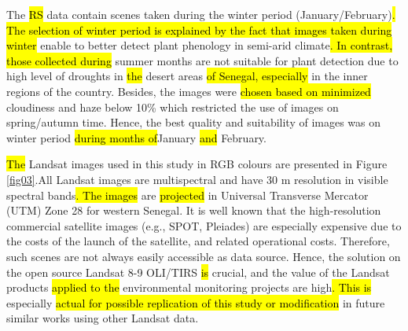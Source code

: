 \documentclass[earth,article,submit,pdftex,moreauthors]{Definitions/mdpi}
\begin{document}
The \hl{RS} data contain scenes taken during the winter period (January/February)\hl{. The selection of winter period is explained by the fact that images taken during winter }enable to better detect plant phenology in semi-arid climate\hl{. In contrast, those collected during }summer months are not suitable for plant detection due to high level of droughts in \hl{the }desert areas \hl{of Senegal, especially }in the inner regions of the country. Besides, the images were \hl{chosen based on minimized} cloudiness and haze below 10\% which restricted the use of images on spring/autumn time. Hence, the best quality and suitability of images was on winter period \hl{during months of}January \hl{and} February.

\hl{The} Landsat images used in this study in RGB colours are presented in Figure \ref{fig03}.All Landsat images are multispectral and have 30 m resolution in visible spectral bands\hl{. The images }are \hl{projected} in Universal Transverse Mercator (UTM) Zone 28 for western Senegal. It is well known that the high-resolution commercial satellite images (e.g., SPOT, Pleiades) are especially expensive due to the costs of the launch of the satellite, and related operational costs. Therefore, such scenes are not always easily accessible as data source. Hence, the solution\hl{ }on the open source Landsat 8-9 OLI/TIRS \hl{is} crucial, and the value of\hl{ }the Landsat products \hl{applied to the }environmental monitoring projects are high\hl{. This is }especially \hl{actual for possible replication of this study or modification} in future similar works using other Landsat data. 
\end{document}
